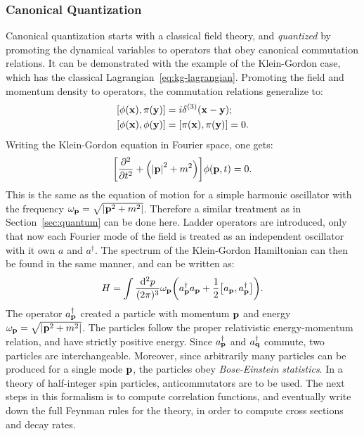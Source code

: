 \subsubsection{Canonical Quantization}
\label{sec:canonical}

Canonical quantization starts with a classical field theory, and \emph{quantized} by promoting the dynamical variables to operators that obey canonical commutation relations. It can be demonstrated with the example of the Klein-Gordon case, which has the classical Lagrangian~\ref{eq:kg-lagrangian}. Promoting the field and momentum density to operators, the commutation relations generalize to:
\begin{equation}
\begin{split}
\comm{\phi\qty(\vb{x})}{\pi\qty(\vb{y})}&=i\delta^{(3)}\qty(\vb{x}-\vb{y});\\
\comm{\phi\qty(\vb{x})}{\phi\qty(\vb{y})}&=\comm{\pi\qty(\vb{x})}{\pi\qty(\vb{y})}=0.
\end{split}
\end{equation}
Writing the Klein-Gordon equation in Fourier space, one gets:
\begin{equation}
\qty[\pdv[2]{t} + \qty(\abs{\vb{p}}^2+m^2)]\phi(\vb{p},t)=0.
\end{equation}
This is the same as the equation of motion for a simple harmonic oscillator with the frequency $\omega_{\vb{p}}=\sqrt{\abs{\vb{p}^2+m^2}}$. Therefore a similar treatment as in  Section~\ref{sec:quantum} can be done here. Ladder operators are introduced, only that now each Fourier mode of the field is treated as an independent oscillator with it own $a$ and $a^\dagger$. The spectrum of the Klein-Gordon Hamiltonian can then be found in the same manner, and can be written as:
\begin{equation}
H=\int \frac{\dd^2 p}{(2\pi)^3} \omega_{\vb{p}}\qty(a^\dagger_{\vb{p}}a_{\vb{p}}+\frac{1}{2}\comm{a_{\vb{p}}}{a^\dagger_{\vb{p}}}).
\end{equation}
The operator $a^\dagger_{\vb{p}}$ created a particle with momentum $\vb{p}$ and energy $\omega_{\vb{p}}=\sqrt{\abs{\vb{p}^2+m^2}}$. The particles follow the proper relativistic energy-momentum relation, and have strictly positive energy. Since $a^\dagger_{\vb{p}}$ and $a^\dagger_{\vb{q}}$ commute, two particles are interchangeable. Moreover, since arbitrarily many particles can be produced for a single mode $\vb{p}$, the particles obey \emph{Bose-Einstein statistics}. In a theory of half-integer spin particles, anticommutators are to be used. The next steps in this formalism is to compute correlation functions, and eventually write down the full Feynman rules for the theory, in order to compute cross sections and decay rates.

